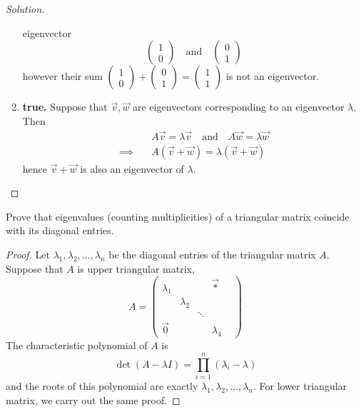 \documentclass{article}
\begin{document}
\begin{proof}[Solution]
\begin{enumerate}[label={(\alph*)}]
      eigenvector 
      \[
        \begin{pmatrix} 1\\0 \end{pmatrix}
        \quad\text{and}\quad
        \begin{pmatrix} 0\\1 \end{pmatrix}
      \]
      however their sum 
      $
        \begin{pmatrix} 1\\0 \end{pmatrix}+
        \begin{pmatrix} 0\\1 \end{pmatrix}=
        \begin{pmatrix} 1\\1 \end{pmatrix}
      $
      is not an eigenvector.
    \item \textbf{true.} Suppose that $\vec{v},\vec{w}$ are eigenvectors 
      corresponding to an eigenvector $\lambda$. Then
      \begin{align*}
        &A\vec{v}=\lambda\vec{v}
        \quad\text{and}\quad 
        A\vec{w}=\lambda\vec{w}\\\implies\quad
        &A(\vec{v}+\vec{w})=\lambda(\vec{v}+\vec{w})
      \end{align*}
      hence $\vec{v}+\vec{w}$ is also an eigenvector of $\lambda$.
  \end{enumerate}
\end{proof}
\setcounter{exercise}{4}
\begin{exercise}
  Prove that eigenvalues (counting multiplicities) of a
  triangular matrix coincide with its diagonal entries.
\end{exercise}
\begin{proof}
  Let $\lambda_1,\lambda_2,\dots,\lambda_n$ be the diagonal entries of 
  the triangular matrix $A$. Suppose that $A$ is upper triangular 
  matrix,
  \[
    A=
    \begin{pmatrix}
      \lambda_1 & & & \vec{*}\\
                & \lambda_2 & & &\\
                & & \ddots  & & \\
      \vec{0}   & & &  \lambda_4
    \end{pmatrix}
  \]
  The characteristic polynomial of $A$ is
  \[
    \det(A-\lambda I)=\prod_{i=1}^{n}(\lambda_i-\lambda)
  \]
  and the roots of this polynomial are exactly 
  $\lambda_1,\lambda_2,\dots,\lambda_n$. For lower triangular 
  matrix, we carry out the same proof.
\end{proof}
\end{document}
